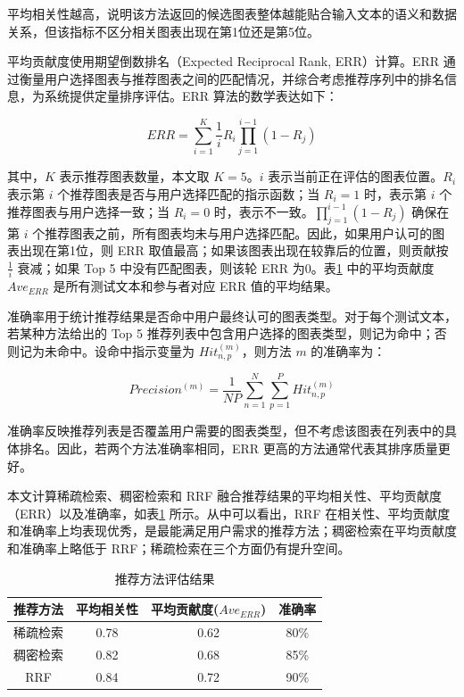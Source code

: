 平均相关性越高，说明该方法返回的候选图表整体越能贴合输入文本的语义和数据关系，但该指标不区分相关图表出现在第1位还是第5位。

平均贡献度使用期望倒数排名（Expected Reciprocal Rank, ERR）计算。ERR 通过衡量用户选择图表与推荐图表之间的匹配情况，并综合考虑推荐序列中的排名信息，为系统提供定量排序评估。ERR 算法的数学表达如下：

\begin{equation}
    ERR = \sum_{i=1}^{K} \frac{1}{i} R_i\prod_{j=1}^{i-1} (1 - R_j)
\end{equation}

其中，$K$ 表示推荐图表数量，本文取 $K=5$。$i$ 表示当前正在评估的图表位置。$R_i$ 表示第 $i$ 个推荐图表是否与用户选择匹配的指示函数；当 $R_i=1$ 时，表示第 $i$ 个推荐图表与用户选择一致；当 $R_i=0$ 时，表示不一致。$\prod_{j=1}^{i-1}(1-R_j)$ 确保在第 $i$ 个推荐图表之前，所有图表均未与用户选择匹配。因此，如果用户认可的图表出现在第1位，则 ERR 取值最高；如果该图表出现在较靠后的位置，则贡献按 $\frac{1}{i}$ 衰减；如果 Top 5 中没有匹配图表，则该轮 ERR 为0。表\ref{tab:err} 中的平均贡献度 $Ave_{ERR}$ 是所有测试文本和参与者对应 ERR 值的平均结果。

准确率用于统计推荐结果是否命中用户最终认可的图表类型。对于每个测试文本，若某种方法给出的 Top 5 推荐列表中包含用户选择的图表类型，则记为命中；否则记为未命中。设命中指示变量为 $Hit_{n,p}^{(m)}$，则方法 $m$ 的准确率为：

\begin{equation}
    Precision^{(m)} = \frac{1}{NP}\sum_{n=1}^{N}\sum_{p=1}^{P} Hit_{n,p}^{(m)}
\end{equation}

准确率反映推荐列表是否覆盖用户需要的图表类型，但不考虑该图表在列表中的具体排名。因此，若两个方法准确率相同，ERR 更高的方法通常代表其排序质量更好。

本文计算稀疏检索、稠密检索和 RRF 融合推荐结果的平均相关性、平均贡献度（ERR）以及准确率，如表\ref{tab:err} 所示。从中可以看出，RRF 在相关性、平均贡献度和准确率上均表现优秀，是最能满足用户需求的推荐方法；稠密检索在平均贡献度和准确率上略低于 RRF；稀疏检索在三个方面仍有提升空间。

\begin{table}[htbp]
\centering
\caption[推荐方法评估结果]{推荐方法评估结果}
\label{tab:err}
\begin{tabular}{cccc}
\toprule
推荐方法 & 平均相关性 & 平均贡献度($Ave_{ERR}$) & 准确率 \\
\midrule
稀疏检索 & 0.78 & 0.62 & 80\% \\
稠密检索 & 0.82 & 0.68 & 85\% \\
RRF & 0.84 & 0.72 & 90\% \\
\bottomrule
\end{tabular}
\end{table}

